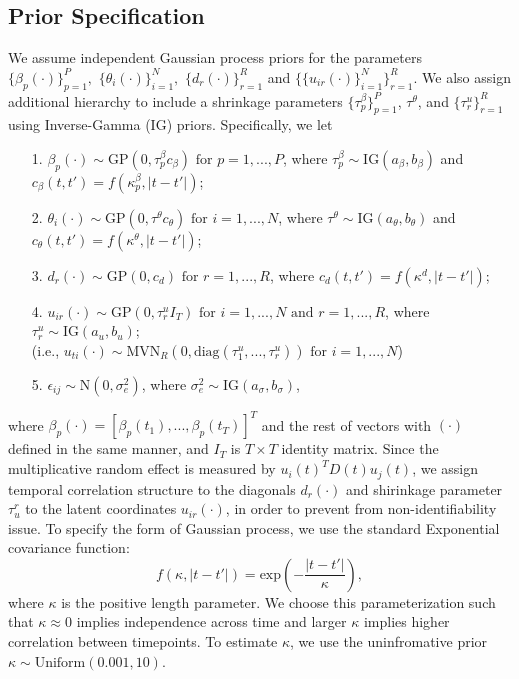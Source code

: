\documentclass[a4paper]{article}
\begin{document}
		\subsection{Prior Specification}\label{subsec: Prior specification}
	We assume independent Gaussian process priors for the parameters $\{\beta_{p}(\cdot)\}_{p=1}^P,$ $\{\theta_{i}(\cdot)\}_{i=1}^N,$ $\{d_{r}(\cdot)\}_{r=1}^R$ and $\{\{u_{ir}(\cdot)\}_{i=1}^N\}_{r=1}^R$. We also assign additional hierarchy to include a shrinkage parameters $\{\tau^{\beta}_p\}_{p=1}^P$, $\tau^{\theta}$, and $\{\tau^{u}_r\}_{r=1}^R$ using Inverse-Gamma (IG) priors. Specifically, we let 
	\begin{center}
		\begin{itemize}
			\item[1.] $\beta_{p}(\cdot) \sim \mbox{GP}(0, \tau^{\beta}_pc_\beta)\mbox{ for }p = 1,...,P$, where $\tau^{\beta}_p \sim \mbox{IG}(a_\beta, b_\beta)$ and $c_\beta(t, t')=f(\kappa^{\beta}_p, |t-t'|)$;
			\item[2.] $\theta_{i}(\cdot) \sim \mbox{GP}(0, \tau^{\theta}c_\theta)\mbox{ for }i = 1,...,N$, where $\tau^{\theta}\sim \mbox{IG}(a_\theta, b_\theta)$ and $c_\theta(t, t')=f(\kappa^\theta, |t-t'|)$;
			\item[3.] $d_{r}(\cdot) \sim \mbox{GP}(0, c_d)\mbox{ for }r = 1,...,R$, where $c_d(t, t')=f(\kappa^d, |t-t'|)$;
			\item[4.] $u_{ir}(\cdot) \sim\mbox{GP}(0, \tau^{u}_rI_T)\mbox{ for }i = 1,...,N \mbox{ and } r=1,...,R$, where $\tau_r^{u} \sim \mbox{IG}(a_u, b_u)$;\\
			(i.e., $u_{ti}(\cdot) \sim\mbox{MVN}_R(0, \mbox{diag}(\tau^{u}_1, ..., \tau^{u}_r))\mbox{ for }i = 1,...,N$)
			\item[5.] $\epsilon_{ij} \sim \mbox{N}(0, \sigma_e^2)$, where $\sigma_e^2 \sim \mbox{IG}(a_\sigma, b_\sigma)$,
		\end{itemize}
	\end{center}
	where $\beta_{p}(\cdot) = [\beta_{p}(t_1),...,\beta_{p}(t_T)]^T$ and the rest of vectors with $(\cdot)$ defined in the same manner, and $I_T$ is $T\times T$ identity matrix. Since the multiplicative random effect is measured by $u_i(t)^TD(t)u_j(t)$, we assign temporal correlation structure to the diagonals $d_{r}(\cdot)$ and shirinkage parameter $\tau_u^r$ to the latent coordinates $u_{ir}(\cdot)$, in order to prevent from non-identifiability issue. To specify the form of Gaussian process, we use the standard Exponential covariance function:
	\begin{equation*}
	f(\kappa, |t-t'|) = \mbox{exp}\left(-\frac{|t-t'|}{\kappa}\right),
	\end{equation*}
where $\kappa$ is the positive length parameter. We choose this parameterization such that $\kappa \approx 0$ implies independence across time and larger $\kappa$ implies higher correlation between timepoints. To estimate $\kappa$, we use the uninfromative prior $\kappa \sim \mbox{Uniform}(0.001, 10)$.
\end{document}
